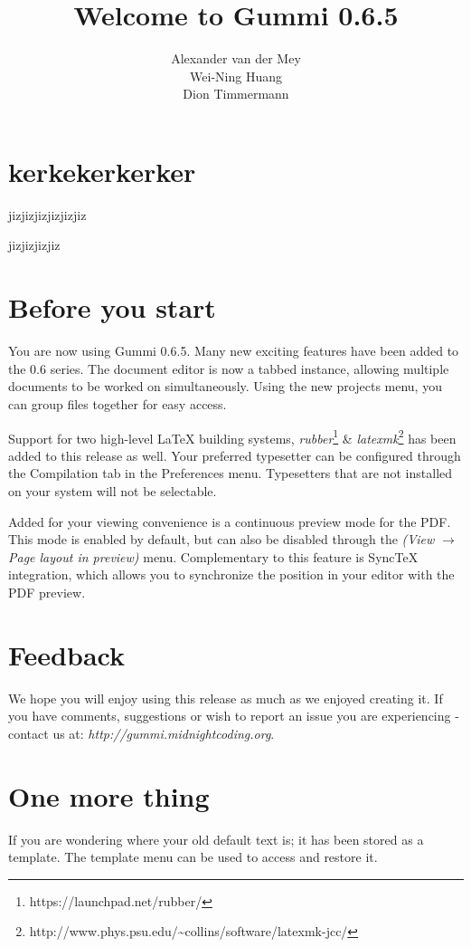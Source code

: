 \documentclass[11pt]{article}
\title{\textbf{Welcome to Gummi 0.6.5}}
\author{Alexander van der Mey\\
		Wei-Ning Huang\\
		Dion Timmermann}
\date{}
\begin{document}
\maketitle

\section{kerkekerkerker}
jizjizjizjizjizjiz

jizjizjizjiz
\section{Before you start}

You are now using Gummi 0.6.5. Many new exciting features have been added to
the 0.6 series. The document editor is now a tabbed instance, allowing multiple
documents to be worked on simultaneously. Using the new projects menu, you can
group files together for easy access. 

Support for two high-level {\LaTeX} building systems,
\emph{rubber}\footnote{https://launchpad.net/rubber/} \&
\emph{latexmk}\footnote{http://www.phys.psu.edu/{\textasciitilde}collins/software/latexmk-jcc/}
has been added to this release as well. Your preferred typesetter can be
configured through the Compilation tab in the Preferences menu. Typesetters
that are not installed on your system will not be selectable. 

Added for your viewing convenience is a continuous preview mode for the PDF.
This mode is enabled by default, but can also be disabled through the
\emph{(View $\rightarrow$ Page layout in preview)} menu. Complementary to this
feature is SyncTeX integration, which allows you to synchronize the position in
your editor with the PDF preview. 

\section{Feedback} We hope you will enjoy using this release as much as we
enjoyed creating it. If you have comments, suggestions or wish to report an
issue you are experiencing - contact us at:
\emph{http://gummi.midnightcoding.org}.

\section{One more thing} If you are wondering where your old default text is;
it has been stored as a template. The template menu can be used to access and
restore it. 
\end{document}
